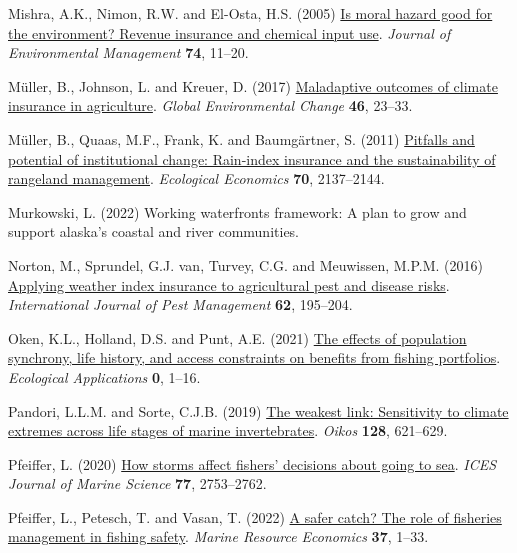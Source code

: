 \documentclass[
  letterpaper,
  DIV=11,
  numbers=noendperiod]{scrartcl}
\newlength{\cslhangindent}
\newlength{\cslentryspacingunit} %
\newenvironment{CSLReferences}[2] %
 {%
  \setlength{\parindent}{0pt}
  \ifodd #1
  \let\oldpar\par
  \def\par{\hangindent=\cslhangindent\oldpar}
  \fi
  \setlength{\parskip}{#2\cslentryspacingunit}
 }%
 {}
\theoremstyle{plain}
\theoremstyle{plain}
\theoremstyle{remark}
\begin{document}
\begin{CSLReferences}{1}{0}
\leavevmode{}%
Mishra, A.K., Nimon, R.W. and El-Osta, H.S. (2005)
\href{https://doi.org/10.1016/j.jenvman.2004.08.003}{Is moral hazard
good for the environment? Revenue insurance and chemical input use}.
\emph{Journal of Environmental Management} \textbf{74}, 11--20.

\leavevmode{}%
Müller, B., Johnson, L. and Kreuer, D. (2017)
\href{https://doi.org/10.1016/j.gloenvcha.2017.06.010}{Maladaptive
outcomes of climate insurance in agriculture}. \emph{Global
Environmental Change} \textbf{46}, 23--33.

\leavevmode{}%
Müller, B., Quaas, M.F., Frank, K. and Baumgärtner, S. (2011)
\href{https://doi.org/10.1016/j.ecolecon.2011.06.011}{Pitfalls and
potential of institutional change: Rain-index insurance and the
sustainability of rangeland management}. \emph{Ecological Economics}
\textbf{70}, 2137--2144.

\leavevmode{}%
Murkowski, L. (2022) Working waterfronts framework: A plan to grow and
support alaska's coastal and river communities.

\leavevmode{}%
Norton, M., Sprundel, G.J. van, Turvey, C.G. and Meuwissen, M.P.M.
(2016) \href{https://doi.org/10.1080/09670874.2016.1184773}{Applying
weather index insurance to agricultural pest and disease risks}.
\emph{International Journal of Pest Management} \textbf{62}, 195--204.

\leavevmode{}%
Oken, K.L., Holland, D.S. and Punt, A.E. (2021)
\href{https://doi.org/10.1002/eap.2307}{The effects of population
synchrony, life history, and access constraints on benefits from fishing
portfolios}. \emph{Ecological Applications} \textbf{0}, 1--16.

\leavevmode{}%
Pandori, L.L.M. and Sorte, C.J.B. (2019)
\href{https://doi.org/10.1111/oik.05886}{The weakest link: Sensitivity
to climate extremes across life stages of marine invertebrates}.
\emph{Oikos} \textbf{128}, 621--629.

\leavevmode{}%
Pfeiffer, L. (2020) \href{https://doi.org/10.1093/icesjms/fsaa145}{How
storms affect fishers' decisions about going to sea}. \emph{ICES Journal
of Marine Science} \textbf{77}, 2753--2762.

\leavevmode{}%
Pfeiffer, L., Petesch, T. and Vasan, T. (2022)
\href{https://doi.org/10.1086/716856}{A safer catch? The role of
fisheries management in fishing safety}. \emph{Marine Resource
Economics} \textbf{37}, 1--33.


\end{CSLReferences}
\end{document}
